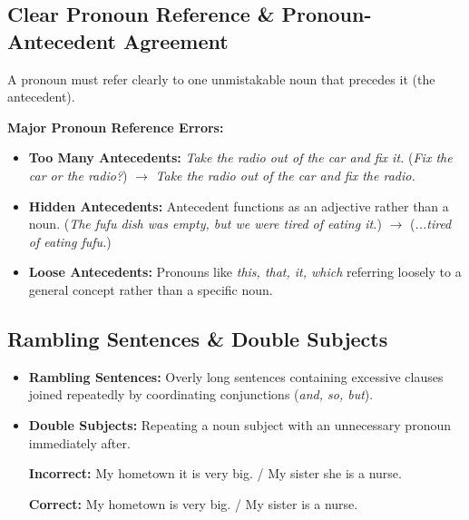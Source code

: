 \documentclass[11pt, a4paper]{article}
\begin{document}
\subsection{Clear Pronoun Reference \& Pronoun-Antecedent Agreement}
A pronoun must refer clearly to one unmistakable noun that precedes it (the antecedent).

\textbf{Major Pronoun Reference Errors:}
\begin{itemize}
    \item \textbf{Too Many Antecedents:} \textit{Take the radio out of the car and fix it.} (\textit{Fix the car or the radio?}) $\rightarrow$ \textit{Take the radio out of the car and fix the radio.}
    \item \textbf{Hidden Antecedents:} Antecedent functions as an adjective rather than a noun. (\textit{The fufu dish was empty, but we were tired of eating it.}) $\rightarrow$ (\textit{...tired of eating fufu.})
    \item \textbf{Loose Antecedents:} Pronouns like \textit{this, that, it, which} referring loosely to a general concept rather than a specific noun.
\end{itemize}

\subsection{Rambling Sentences \& Double Subjects}
\begin{itemize}
    \item \textbf{Rambling Sentences:} Overly long sentences containing excessive clauses joined repeatedly by coordinating conjunctions (\textit{and, so, but}).
    \item \textbf{Double Subjects:} Repeating a noun subject with an unnecessary pronoun immediately after.
    \begin{mdframed}[style=incorrectbox]
        \textbf{Incorrect:} My hometown it is very big. / My sister she is a nurse.
    \end{mdframed}
    \begin{mdframed}[style=correctbox]
        \textbf{Correct:} My hometown is very big. / My sister is a nurse.
    \end{mdframed}
\end{itemize}
\end{document}
